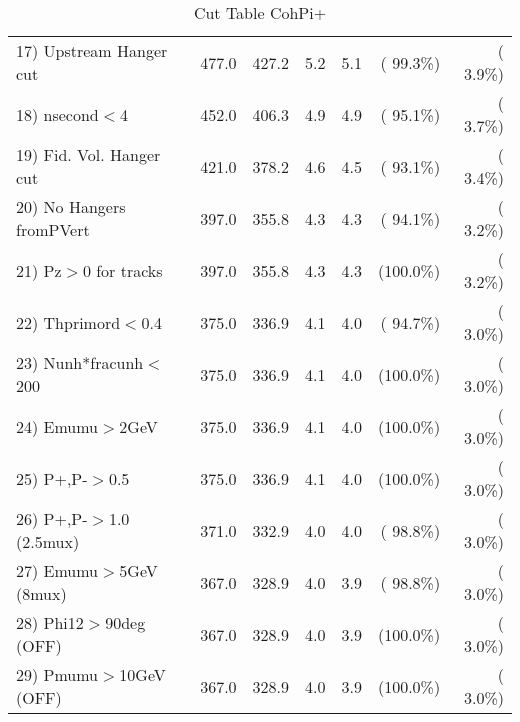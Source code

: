 \begin{table}[h!]
\begin{tabular}{||l||r|r|r|r|r|r||}
 17) Upstream Hanger cut  &        477.0 &        427.2 &          5.2 &          5.1 & ( 99.3\%) & (  3.9\%) \\
 18) nsecond$<$4          &        452.0 &        406.3 &          4.9 &          4.9 & ( 95.1\%) & (  3.7\%) \\
 19) Fid. Vol. Hanger cut &        421.0 &        378.2 &          4.6 &          4.5 & ( 93.1\%) & (  3.4\%) \\
 20) No Hangers fromPVert &        397.0 &        355.8 &          4.3 &          4.3 & ( 94.1\%) & (  3.2\%) \\
 21) Pz$>$0 for tracks    &        397.0 &        355.8 &          4.3 &          4.3 & (100.0\%) & (  3.2\%) \\
 22) Thprimord$<$0.4      &        375.0 &        336.9 &          4.1 &          4.0 & ( 94.7\%) & (  3.0\%) \\
 23) Nunh*fracunh$<$200   &        375.0 &        336.9 &          4.1 &          4.0 & (100.0\%) & (  3.0\%) \\
 24) Emumu$>$2GeV         &        375.0 &        336.9 &          4.1 &          4.0 & (100.0\%) & (  3.0\%) \\
 25) P+,P-$>$0.5          &        375.0 &        336.9 &          4.1 &          4.0 & (100.0\%) & (  3.0\%) \\
 26) P+,P-$>$1.0 (2.5mux) &        371.0 &        332.9 &          4.0 &          4.0 & ( 98.8\%) & (  3.0\%) \\
 27) Emumu$>$5GeV  (8mux) &        367.0 &        328.9 &          4.0 &          3.9 & ( 98.8\%) & (  3.0\%) \\
 28) Phi12$>$90deg  (OFF) &        367.0 &        328.9 &          4.0 &          3.9 & (100.0\%) & (  3.0\%) \\
 29) Pmumu$>$10GeV  (OFF) &        367.0 &        328.9 &          4.0 &          3.9 & (100.0\%) & (  3.0\%) \\
 \hline
 \hline
 \end{tabular}
 \caption{Cut Table  CohPi+   }
 \label{tab-cutcohjpsi-mumu_cohpip}
 \end{table}
